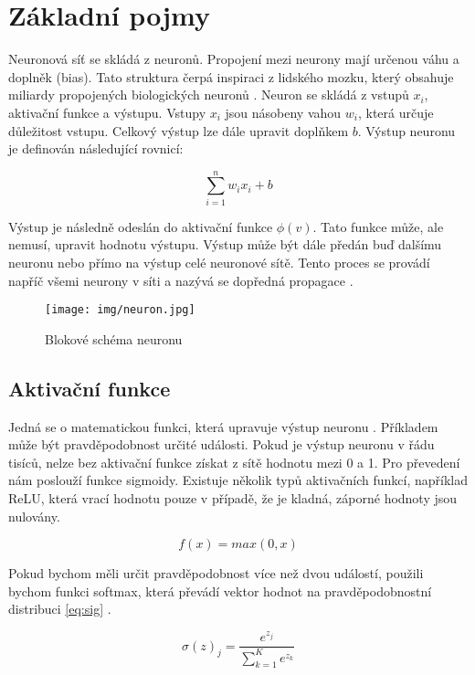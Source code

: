 \documentclass[FM,DP]{tulthesis}
\begin{document}
		\section{Základní pojmy}
		Neuronová síť se skládá z neuronů. Propojení mezi neurony mají určenou váhu a doplněk (bias). Tato struktura čerpá inspiraci z lidského mozku, který obsahuje miliardy propojených biologických neuronů \cite{general}. Neuron se skládá z vstupů $x_i$, aktivační funkce a výstupu. Vstupy $x_i$ jsou násobeny vahou $w_i$, která určuje důležitost vstupu. Celkový výstup lze dále upravit doplňkem $b$. Výstup neuronu je definován následující rovnicí:
		
		\begin{equation}
			\sum_{i=1}^{n} w_i x_i + b
		\end{equation}
		
		Výstup je následně odeslán do aktivační funkce $\phi(v)$. Tato funkce může, ale nemusí, upravit hodnotu výstupu. Výstup může být dále předán buď dalšímu neuronu nebo přímo na výstup celé neuronové sítě. Tento proces se provádí napříč všemi neurony v síti a nazývá se dopředná propagace \cite{general}.
		
		\begin{figure}[H]
			\centering
			\texttt{[image: img/neuron.jpg]}
			\caption{Blokové schéma neuronu \cite{dzone}}
			\label{fig:neuron}
		\end{figure}
		
		\subsection{Aktivační funkce}
		Jedná se o matematickou funkci, která upravuje výstup neuronu \cite{deepai_act}. Příkladem může být pravděpodobnost určité události. Pokud je výstup neuronu v řádu tisíců, nelze bez aktivační funkce získat z sítě hodnotu mezi 0 a 1. Pro převedení nám poslouží funkce sigmoidy. Existuje několik typů aktivačních funkcí, například ReLU, která vrací hodnotu pouze v případě, že je kladná, záporné hodnoty jsou nulovány.
		
		\begin{equation}
			f(x) = max(0,x)
		\end{equation}
		
		Pokud bychom měli určit pravděpodobnost více než dvou událostí, použili bychom funkci softmax, která převádí vektor hodnot na pravděpodobnostní distribuci \ref{eq:sig} \cite{neuralnetwork101_act}.
		
		\begin{equation}
			\sigma(z)_j = \frac{e^{z_j}}{\sum_{k=1}^K e^{z_k}}
		\end{equation}
		
\end{document}
